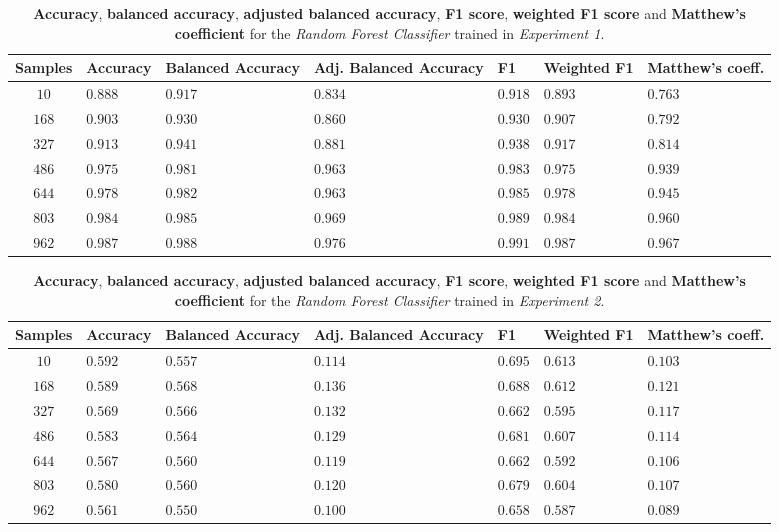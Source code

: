 \documentclass[sigplan,screen]{acmart}
\begin{document}
\begin{table}[h]
  \caption{\textbf{Accuracy}, \textbf{balanced accuracy}, \textbf{adjusted balanced accuracy}, \textbf{F1 score}, \textbf{weighted F1 score} and \textbf{Matthew's coefficient} for the \emph{Random Forest Classifier} trained in \emph{Experiment 1}.}
  \label{tab:rf_1_table_results}
  \begin{tabular}{cllllll}
    \toprule
    \textbf{Samples}&\textbf{Accuracy}&\textbf{Balanced Accuracy}&\textbf{Adj. Balanced Accuracy}&\textbf{F1}&\textbf{Weighted F1}&\textbf{Matthew's coeff.}\\
    \midrule
    $10$ & $0.888$ & $0.917$ & $0.834$ & $0.918$ & $0.893$ & $0.763$\\
    $168$ & $0.903$ & $0.930$ & $0.860$ & $0.930$ & $0.907$ & $0.792$\\
    $327$ & $0.913$ & $0.941$ & $0.881$ & $0.938$ & $0.917$ & $0.814$\\
    $486$ & $0.975$ & $0.981$ & $0.963$ & $0.983$ & $0.975$ & $0.939$\\
    $644$ & $0.978$ & $0.982$ & $0.963$ & $0.985$ & $0.978$ & $0.945$\\
    $803$ & $0.984$ & $0.985$ & $0.969$ & $0.989$ & $0.984$ & $0.960$\\
    $962$ & $0.987$ & $0.988$ & $0.976$ & $0.991$ & $0.987$ & $0.967$\\
    \bottomrule
    \end{tabular}
\end{table}

\begin{table}[h]
  \caption{\textbf{Accuracy}, \textbf{balanced accuracy}, \textbf{adjusted balanced accuracy}, \textbf{F1 score}, \textbf{weighted F1 score} and \textbf{Matthew's coefficient} for the \emph{Random Forest Classifier} trained in \emph{Experiment 2}.}
  \label{tab:rf_2_table_results}
  \begin{tabular}{cllllll}
    \toprule
    \textbf{Samples}&\textbf{Accuracy}&\textbf{Balanced Accuracy}&\textbf{Adj. Balanced Accuracy}&\textbf{F1}&\textbf{Weighted F1}&\textbf{Matthew's coeff.}\\
    \midrule
    $10$ & $0.592$ & $0.557$ & $0.114$ & $0.695$ & $0.613$ & $0.103$\\
    $168$ & $0.589$ & $0.568$ & $0.136$ & $0.688$ & $0.612$ & $0.121$\\
    $327$ & $0.569$ & $0.566$ & $0.132$ & $0.662$ & $0.595$ & $0.117$\\
    $486$ & $0.583$ & $0.564$ & $0.129$ & $0.681$ & $0.607$ & $0.114$\\
    $644$ & $0.567$ & $0.560$ & $0.119$ & $0.662$ & $0.592$ & $0.106$\\
    $803$ & $0.580$ & $0.560$ & $0.120$ & $0.679$ & $0.604$ & $0.107$\\
    $962$ & $0.561$ & $0.550$ & $0.100$ & $0.658$ & $0.587$ & $0.089$\\
    \bottomrule
    \end{tabular}
\end{table}
\end{document}
